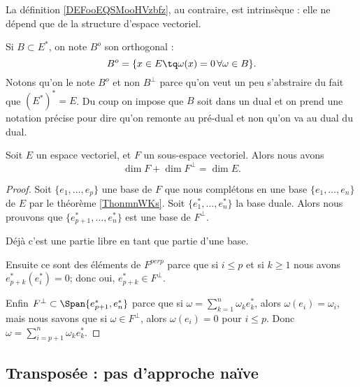 La définition \ref{DEFooEQSMooHVzbfz}, au contraire, est intrinsèque : elle ne dépend que de la structure d'espace vectoriel.

Si \( B\subset E^*\), on note \( B^o\) son orthogonal :
\begin{equation}
    B^o=\{ x\in E\tq \omega(x)=0\,\forall \omega\in B \}.
\end{equation}
Notons qu'on le note \( B^o\) et non \( B^{\perp}\) parce qu'on veut un peu s'abstraire du fait que \( (E^*)^*=E\). Du coup on impose que \( B\) soit dans un dual et on prend une notation précise pour dire qu'on remonte au pré-dual et non qu'on va au dual du dual.


\begin{proposition} \label{PropXrTDIi}
    Soit \( E\) un espace vectoriel, et \( F\) un sous-espace vectoriel. Alors nous avons
    \begin{equation}
        \dim F+\dim F^{\perp}=\dim E.
    \end{equation}
\end{proposition}

\begin{proof}
    Soit \( \{ e_1,\ldots, e_p \}\) une base de \( F\) que nous complétons en une base \( \{ e_1,\ldots, e_n \}\) de \( E\) par le théorème \ref{ThonmnWKs}. Soit \( \{ e_1^*,\ldots, e^*_n \}\) la base duale. Alors nous prouvons que \( \{ e^*_{p+1},\ldots, e_n^* \}\) est une base de \( F^{\perp}\). 
    
    Déjà c'est une partie libre en tant que partie d'une base.

    Ensuite ce sont des éléments de \( F^{perp}\) parce que si \( i\leq p\) et si \( k\geq 1\) nous avons \( e^*_{p+k}(e_i^*)=0\); donc oui, \( e^*_{p+k}\in F^{\perp}\).

    Enfin \( F^{\perp}\subset\Span\{ e_{p+1}^*,e_n^* \}\) parce que si \( \omega=\sum_{k=1}^n\omega_ke_k^*\), alors \( \omega(e_i)=\omega_i\), mais nous savons que si \( \omega\in F^{\perp}\), alors \( \omega(e_i)=0\) pour \( i\leq p\). Donc \( \omega=\sum_{i=p+1}^n\omega_ke^*_k\).
\end{proof}

\subsection{Transposée : pas d'approche naïve}

